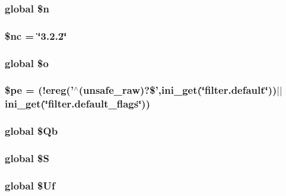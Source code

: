 \subsubsection[{\$n}]{\setlength{\rightskip}{0pt plus 5cm}global \$n}\label{da/d8e/adminer_8php_a78b95310c08cdfc3365c920a25551bd2}
\subsubsection[{\$nc}]{\setlength{\rightskip}{0pt plus 5cm}\$nc = \char`\"{}3.2.2\char`\"{}}\label{da/d8e/adminer_8php_a690c1f5d1669e041b724523dee2c44b7}
\subsubsection[{\$o}]{\setlength{\rightskip}{0pt plus 5cm}global \$o}\label{da/d8e/adminer_8php_ae1e1e5643157fdd93b96903bb96e08db}
\subsubsection[{\$pe}]{\setlength{\rightskip}{0pt plus 5cm}\$pe = (!ereg('$^\wedge$(unsafe\_\-raw)?\$',ini\_\-get(\char`\"{}filter.default\char`\"{}))$|$$|$ini\_\-get(\char`\"{}filter.default\_\-flags\char`\"{}))}\label{da/d8e/adminer_8php_a460b4bb3985fb77ef7420d484f7d87e1}
\subsubsection[{\$Qb}]{\setlength{\rightskip}{0pt plus 5cm}global \$Qb}\label{da/d8e/adminer_8php_a9ae5d2560c82c6dd46cc6870aa84c633}
\subsubsection[{\$S}]{\setlength{\rightskip}{0pt plus 5cm}global \$S}\label{da/d8e/adminer_8php_aa8bfb3e7a534166b0b2174bbe2ba5e63}
\subsubsection[{\$Uf}]{\setlength{\rightskip}{0pt plus 5cm}global \$Uf}\label{da/d8e/adminer_8php_a82aa96c566851b24ead3b2941b891a25}
